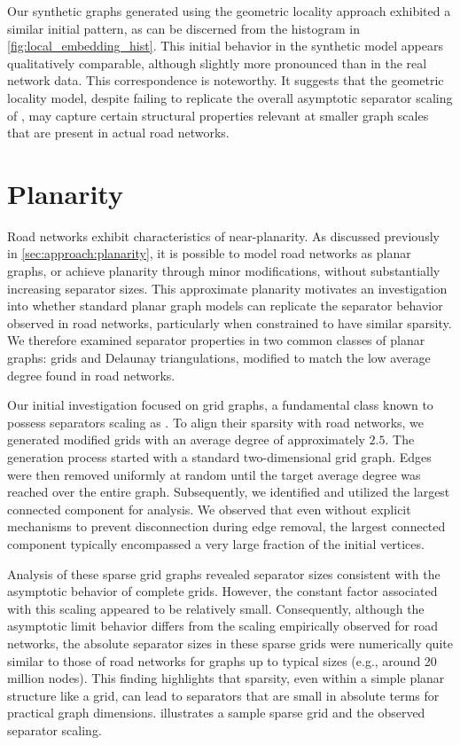 Our synthetic graphs generated using the geometric locality approach exhibited a similar initial pattern, as can be discerned from the histogram in \cref{fig:local_embedding_hist}.
This initial behavior in the synthetic model appears qualitatively comparable, although slightly more pronounced than in the real network data.
This correspondence is noteworthy.
It suggests that the geometric locality model, despite failing to replicate the overall asymptotic separator scaling of , may capture certain structural properties relevant at smaller graph scales that are present in actual road networks.






\section{Planarity}
\label{sec:synthetic:planarity}

Road networks exhibit characteristics of near-planarity.
As discussed previously in \cref{sec:approach:planarity}, it is possible to model road networks as planar graphs, or achieve planarity through minor modifications, without substantially increasing separator sizes.
This approximate planarity motivates an investigation into whether standard planar graph models can replicate the separator behavior observed in road networks, particularly when constrained to have similar sparsity.
We therefore examined separator properties in two common classes of planar graphs: grids and Delaunay triangulations, modified to match the low average degree found in road networks.

Our initial investigation focused on grid graphs, a fundamental class known to possess separators scaling as .
To align their sparsity with road networks, we generated modified grids with an average degree of approximately \(2.5\).
The generation process started with a standard two-dimensional grid graph.
Edges were then removed uniformly at random until the target average degree was reached over the entire graph.
Subsequently, we identified and utilized the largest connected component for analysis.
We observed that even without explicit mechanisms to prevent disconnection during edge removal, the largest connected component typically encompassed a very large fraction of the initial vertices.

Analysis of these sparse grid graphs revealed separator sizes consistent with the  asymptotic behavior of complete grids.
However, the constant factor associated with this scaling appeared to be relatively small.
Consequently, although the asymptotic limit behavior differs from the  scaling empirically observed for road networks, the absolute separator sizes in these sparse grids were numerically quite similar to those of road networks for graphs up to typical sizes (e.g., around 20 million nodes).
This finding highlights that sparsity, even within a simple planar structure like a grid, can lead to separators that are small in absolute terms for practical graph dimensions.
 illustrates a sample sparse grid and the observed separator scaling.

